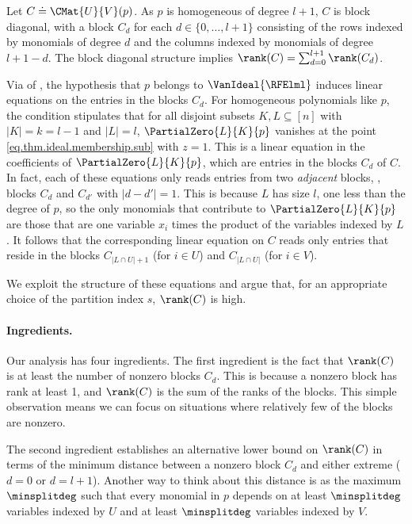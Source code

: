 Let $C \doteq \CMat{U}{V}(p)$.
As $p$ is homogeneous of degree $l+1$,
\(C\) is block diagonal,
with a block \(C_d\) for each \(d \in \{0,\ldots,l+1\}\)
consisting of the rows indexed by monomials of degree \(d\)
and the columns indexed by monomials of degree \(l+1-d\).
The block diagonal structure implies $\rank(C) = \sum_{d=0}^{l+1} \rank(C_d)$.

Via  of , the hypothesis that \(p\) belongs to \(\VanIdeal{\RFElml}\) induces linear equations on the entries in the blocks \(C_d\). For homogeneous polynomials like $p$, the condition stipulates that for all disjoint subsets $K,L \subseteq [n]$ with $|K| = k = l-1$ and $|L| = l$, \(\PartialZero{L}{K}{p}\) vanishes at the point \eqref{eq.thm.ideal.membership.sub} with $z=1$. This is a linear equation in the coefficients of \(\PartialZero{L}{K}{p}\), which are entries in the blocks $C_d$ of $C$. In fact, each of these equations only reads entries from two \emph{adjacent} blocks, \ie, blocks $C_d$ and $C_{d'}$ with \(|d - d'| = 1\). This is because \(L\) has size \(l\), one less than the degree of \(p\), so the only monomials that contribute to $\PartialZero{L}{K}{p}$ are those that are one variable \(x_i\) times the product of the variables indexed by \(L\). It follows that the corresponding linear equation on \(C\) reads only entries that reside in the blocks $C_{|L \cap U|+1}$ (for $i \in U$) and $C_{|L\cap U|}$ (for $i \in V$).

We exploit the structure of these equations and argue that, for an appropriate choice of the partition index $s$, $\rank(C)$ is high. 

\paragraph{Ingredients.}
Our analysis has four ingredients.
The first ingredient is the fact that $\rank(C)$ is at least the number of nonzero blocks $C_d$. This is because a nonzero block has rank at least 1, and $\rank(C)$ is the sum of the ranks of the blocks. This simple observation means we can focus on situations where relatively few of the blocks are nonzero.

The second ingredient establishes an alternative lower bound on \(\rank(C)\) in terms of the minimum distance between a nonzero block \(C_d\) and either extreme (\(d=0\) or \(d=l+1\)). Another way to think about this distance is as the maximum \(\minsplitdeg\) such that every monomial in \(p\) depends on at least \(\minsplitdeg\) variables indexed by \(U\) and at least \(\minsplitdeg\) variables indexed by \(V\).

